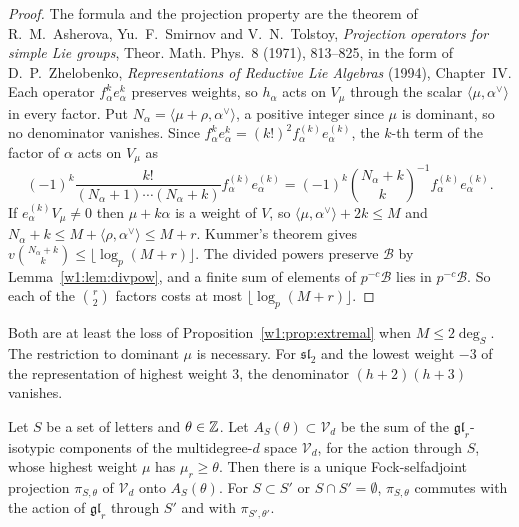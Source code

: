 \begin{proof}
The formula and the projection property are the theorem of R.~M.~Asherova, Yu.~F.~Smirnov and V.~N.~Tolstoy, \emph{Projection operators for simple Lie groups}, Theor. Math. Phys.~8 (1971), 813--825, in the form of D.~P.~Zhelobenko, \emph{Representations of Reductive Lie Algebras} (1994), Chapter~IV. Each operator $f_\alpha^ke_\alpha^k$ preserves weights, so $h_\alpha$ acts on $V_\mu$ through the scalar $\langle\mu,\alpha^\vee\rangle$ in every factor. Put $N_\alpha=\langle\mu+\rho,\alpha^\vee\rangle$, a positive integer since $\mu$ is dominant, so no denominator vanishes. Since $f_\alpha^ke_\alpha^k=(k!)^2f_\alpha^{(k)}e_\alpha^{(k)}$, the $k$-th term of the factor of $\alpha$ acts on $V_\mu$ as
\[
(-1)^k\frac{k!}{(N_\alpha+1)\cdots(N_\alpha+k)}f_\alpha^{(k)}e_\alpha^{(k)}=(-1)^k\binom{N_\alpha+k}{k}^{-1}f_\alpha^{(k)}e_\alpha^{(k)} .
\]
If $e_\alpha^{(k)}V_\mu\ne0$ then $\mu+k\alpha$ is a weight of $V$, so $\langle\mu,\alpha^\vee\rangle+2k\le M$ and $N_\alpha+k\le M+\langle\rho,\alpha^\vee\rangle\le M+r$. Kummer's theorem gives $v\binom{N_\alpha+k}k\le\lfloor\log_p(M+r)\rfloor$. The divided powers preserve $\mathcal B$ by Lemma~\ref{w1:lem:divpow}, and a finite sum of elements of $p^{-c}\mathcal B$ lies in $p^{-c}\mathcal B$. So each of the $\binom r2$ factors costs at most $\lfloor\log_p(M+r)\rfloor$.
\end{proof}

Both are at least the loss of Proposition~\ref{w1:prop:extremal} when $M\le2\deg_S$. The restriction to dominant $\mu$ is necessary. For $\mathfrak{sl}_2$ and the lowest weight $-3$ of the representation of highest weight $3$, the denominator $(h+2)(h+3)$ vanishes.

\begin{proposition}\label{w1:prop:projexists}
Let $S$ be a set of letters and $\theta\in\mathbb Z$. Let $A_S(\theta)\subset\mathcal V_d$ be the sum of the $\mathfrak{gl}_r$-isotypic components of the multidegree-$d$ space $\mathcal V_d$, for the action through $S$, whose highest weight $\mu$ has $\mu_r\ge\theta$. Then there is a unique Fock-selfadjoint projection $\pi_{S,\theta}$ of $\mathcal V_d$ onto $A_S(\theta)$. For $S\subset S'$ or $S\cap S'=\emptyset$, $\pi_{S,\theta}$ commutes with the action of $\mathfrak{gl}_r$ through $S'$ and with $\pi_{S',\theta'}$.
\end{proposition}

